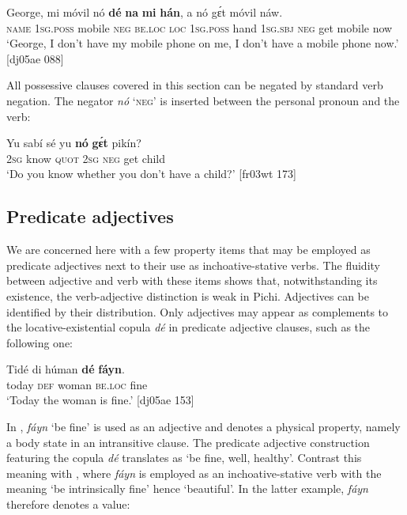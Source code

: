 \ea%
    \label{ex:key:828}
    \gll George,  mi    móvil  nó  \textbf{dé}    \textbf{na}  \textbf{mi}    \textbf{hán},  
a    nó  gɛ́t  móvil  náw.\\
\textsc{name}  \textsc{1sg.poss}  mobile  \textsc{neg}  \textsc{be.loc}  \textsc{loc}  \textsc{1sg.poss}  hand
\textsc{1sg.sbj}  \textsc{neg}  get  mobile  now\\

\glt ‘George, I don’t have my mobile phone on me, I don’t have 
a mobile phone now.’ [dj05ae 088]
\z

All possessive clauses covered in this section can be negated by standard verb negation. The negator \textit{nó} ‘\textsc{neg}’ is inserted between the personal pronoun and the verb:


\ea%
    \label{ex:key:829}
    \gll Yu  sabí    sé    yu  \textbf{nó}  \textbf{gɛ́t}  pikín?\\
\textsc{2sg}  know  \textsc{quot}    \textsc{2sg}  \textsc{neg}  get  child\\

\glt ‘Do you know whether you don’t have a child?’ [fr03wt 173]
\z

\subsection{Predicate adjectives}\label{sec:7.6.5}

We are concerned here with a few property items that may be employed as predicate adjectives next to their use as inchoative-stative verbs. The fluidity between adjective and verb with these items shows that, notwithstanding its existence, the verb-adjective distinction is weak in Pichi. Adjectives can be identified by their distribution. Only adjectives may appear as complements to the locative-existential copula \textit{dé} in predicate adjective clauses, such as the following one: 


\ea%
    \label{ex:key:830}
    \gll Tidé    di  húman  \textbf{dé}    \textbf{fáyn}.\\
today  \textsc{def}  woman  \textsc{be.loc}  fine\\

\glt ‘Today the woman is fine.’ [dj05ae 153]
\z

In , \textit{fáyn} ‘be fine’ is used as an adjective and denotes a physical property, namely a body state in an intransitive clause. The predicate adjective construction featuring the copula \textit{dé} translates as ‘be fine, well, healthy’. Contrast this meaning with , where \textit{fáyn} is employed as an inchoative-stative verb with the meaning ‘be intrinsically fine’ hence ‘beautiful’. In the latter example, \textit{fáyn} therefore denotes a value:


